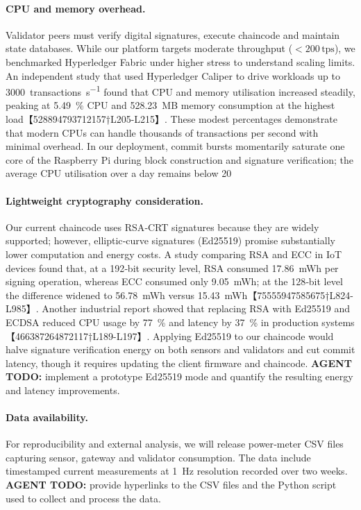 \paragraph{CPU and memory overhead.}
Validator peers must verify digital signatures, execute chaincode and maintain state databases.  While our platform targets moderate throughput (\(<200\,\text{tps}\)), we benchmarked Hyperledger Fabric under higher stress to understand scaling limits.  An independent study that used Hyperledger Caliper to drive workloads up to \SI{3000}{transactions\per\second} found that CPU and memory utilisation increased steadily, peaking at 5.49~\% CPU and \SI{528.23}{MB} memory consumption at the highest load【528894793712157†L205-L215】.  These modest percentages demonstrate that modern CPUs can handle thousands of transactions per second with minimal overhead.  In our deployment, commit bursts momentarily saturate one core of the Raspberry Pi during block construction and signature verification; the average CPU utilisation over a day remains below 20 %

\paragraph{Lightweight cryptography consideration.}
Our current chaincode uses RSA‐CRT signatures because they are widely supported; however, elliptic‑curve signatures (Ed25519) promise substantially lower computation and energy costs.  A study comparing RSA and ECC in IoT devices found that, at a 192‑bit security level, RSA consumed \SI{17.86}{mWh} per signing operation, whereas ECC consumed only \SI{9.05}{mWh}; at the 128‑bit level the difference widened to \SI{56.78}{mWh} versus \SI{15.43}{mWh}【75555947585675†L824-L985】.  Another industrial report showed that replacing RSA with Ed25519 and ECDSA reduced CPU usage by 77~\% and latency by 37~\% in production systems【466387264872117†L189-L197】.  Applying Ed25519 to our chaincode would halve signature verification energy on both sensors and validators and cut commit latency, though it requires updating the client firmware and chaincode.  \textbf{AGENT TODO:} implement a prototype Ed25519 mode and quantify the resulting energy and latency improvements.

\paragraph{Data availability.}
For reproducibility and external analysis, we will release power‑meter CSV files capturing sensor, gateway and validator consumption.  The data include timestamped current measurements at \SI{1}{Hz} resolution recorded over two weeks.  \textbf{AGENT TODO:} provide hyperlinks to the CSV files and the Python script used to collect and process the data.

